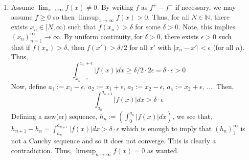 \documentclass[12pt]{article}
\newenvironment{solution}[2][Solution]{\begin{trivlist}
\item[\hskip \labelsep {\bfseries #1}]}{\end{trivlist}}
\begin{document}
\begin{solution}{}
\begin{enumerate}
		\item[(ii.)] Assume $\lim_{x\to\infty} f(x) \neq 0$. By writing $f$ as $f^{+} - f^{-}$ if necessary, we may assume $f\geq 0$ so then $\limsup_{x\to\infty} f(x)>0$.
		Thus, for all $N\in\mathbb{N}$, there exists $x_n\in[N,\infty)$ such that $f(x_n)>\delta$ for some $\delta>0$. Note, this implies $(x_n)_{n=1}^{\infty} \to \infty$.
		By uniform continuity, for $\delta>0$, there exists $\epsilon>0$ such that if $f(x_n)>\delta$, then $f(x')>\delta/2$ for all $x'$ with $|x_n-x'|<\epsilon$ (for all $n$).
		Thus,
		\[ \int_{x_n-\epsilon}^{x_n+\epsilon} |f(x)|dx \geq \delta/2 \cdot 2\epsilon = \delta \cdot \epsilon > 0 \]
		Now, define $a_1 := x_1 - \epsilon$, $a_2 := x_1 + \epsilon$, $a_3 := x_2 - \epsilon$, $a_4 := x_2 + \epsilon$, $\hdots$. Then,
		\[ \int_{a_n}^{a_{n+1}} |f(x)|dx > \delta \cdot \epsilon \]
		Defining a new(er) sequence, $h_n := (\int_{0}^{a_{n}} |f(x)|dx)$, we see that, $h_{n+1} - h_n = \int_{a_n}^{a_{n+1}} |f(x)|dx > \delta\cdot \epsilon$
		which is enough to imply that $(h_n)_1^{\infty}$ is not a Cauchy sequence and so it does not converge. This is clearly a contradiction. Thus, $\limsup_{n\to\infty} f(x) = 0$
		as wanted.
	\end{enumerate}
\end{solution}
\end{document}

